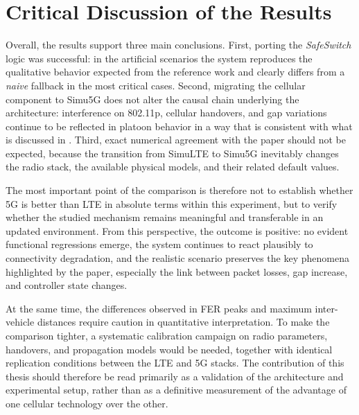 \section{Critical Discussion of the Results}

Overall, the results support three main conclusions. First, porting the \emph{SafeSwitch} logic was successful: in the artificial scenarios the system reproduces the qualitative behavior expected from the reference work and clearly differs from a \emph{naive} fallback in the most critical cases. Second, migrating the cellular component to Simu5G does not alter the causal chain underlying the architecture: interference on 802.11p, cellular handovers, and gap variations continue to be reflected in platoon behavior in a way that is consistent with what is discussed in \cite{segata2023multi-technology}. Third, exact numerical agreement with the paper should not be expected, because the transition from SimuLTE to Simu5G inevitably changes the radio stack, the available physical models, and their related default values.

The most important point of the comparison is therefore not to establish whether 5G is better than LTE in absolute terms within this experiment, but to verify whether the studied mechanism remains meaningful and transferable in an updated environment. From this perspective, the outcome is positive: no evident functional regressions emerge, the system continues to react plausibly to connectivity degradation, and the realistic scenario preserves the key phenomena highlighted by the paper, especially the link between packet losses, gap increase, and controller state changes.

At the same time, the differences observed in FER peaks and maximum inter-vehicle distances require caution in quantitative interpretation. To make the comparison tighter, a systematic calibration campaign on radio parameters, handovers, and propagation models would be needed, together with identical replication conditions between the LTE and 5G stacks. The contribution of this thesis should therefore be read primarily as a validation of the architecture and experimental setup, rather than as a definitive measurement of the advantage of one cellular technology over the other.
